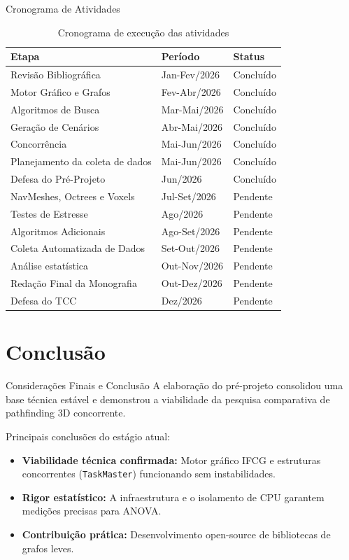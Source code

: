 \documentclass[11pt]{beamer}
\begin{document}
\begin{frame}{Cronograma de Atividades}
    \begin{table}[h]\centering
        \caption{Cronograma de execução das atividades}\label{tab:crono1}
        \scriptsize
        \begin{tabular}{lll}\toprule
        \textbf{Etapa} & \textbf{Período} & \textbf{Status} \\\midrule
        Revisão Bibliográfica & Jan-Fev/2026 & Concluído \\
        Motor Gráfico e Grafos & Fev-Abr/2026 & Concluído \\
        Algoritmos de Busca & Mar-Mai/2026 & Concluído \\
        Geração de Cenários & Abr-Mai/2026 & Concluído \\
        Concorrência & Mai-Jun/2026 & Concluído \\
        Planejamento da coleta de dados & Mai-Jun/2026 & Concluído \\
        Defesa do Pré-Projeto & Jun/2026 & Concluído \\
        NavMeshes, Octrees e Voxels & Jul-Set/2026 & Pendente \\
        Testes de Estresse & Ago/2026 & Pendente \\
        Algoritmos Adicionais & Ago-Set/2026 & Pendente \\
        Coleta Automatizada de Dados & Set-Out/2026 & Pendente \\
        Análise estatística & Out-Nov/2026 & Pendente \\
        Redação Final da Monografia & Out-Dez/2026 & Pendente \\
        Defesa do TCC & Dez/2026 & Pendente \\
        \bottomrule
        \end{tabular}
    \end{table}
\end{frame}

\section{Conclusão}

\begin{frame}{Considerações Finais e Conclusão}
    A elaboração do pré-projeto consolidou uma base técnica estável e demonstrou a viabilidade da pesquisa comparativa de pathfinding 3D concorrente.
    \vspace{1.5em}
    
    Principais conclusões do estágio atual:
    \begin{itemize}
        \item \textbf{Viabilidade técnica confirmada:} Motor gráfico IFCG e estruturas concorrentes (\texttt{TaskMaster}) funcionando sem instabilidades.
        \item \textbf{Rigor estatístico:} A infraestrutura e o isolamento de CPU garantem medições precisas para ANOVA.
        \item \textbf{Contribuição prática:} Desenvolvimento open-source de bibliotecas de grafos leves.
    \end{itemize}
\end{frame}
\end{document}
